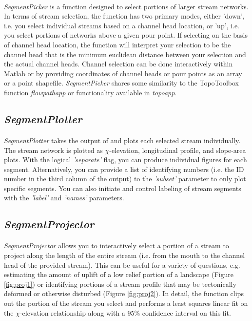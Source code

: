 \paragraph{}\textit{SegmentPicker} is a function designed to select portions of larger stream networks. In terms of stream selection, the function has two primary modes, either 'down', i.e. you select individual streams based on a channel head location, or 'up', i.e. you select portions of networks above a given pour point. If selecting on the basis of channel head location, the function will interpret your selection to be the channel head that is the minimum euclidean distance between your selection and the actual channel heads. Channel selection can be done interactively within Matlab or by providing coordinates of channel heads or pour points as an array or a point shapefile. \textit{SegmentPicker} shares some similarity to the TopoToolbox function \textit{flowpathapp} or functionality available in \textit{topoapp}.

\subsection{\textit{SegmentPlotter}}
\paragraph{}\textit{SegmentPlotter} takes the output of  and plots each selected stream individually. The stream network is plotted as $\chi$-elevation, longitudinal profile, and slope-area plots. With the logical \textit{'separate'} flag, you can produce individual figures for each segment. Alternatively, you can provide a list of identifying numbers (i.e. the ID number in the third column of the  output) to the \textit{'subset'} parameter to only plot specific segments. You can also initiate and control labeling of stream segments with the \textit{'label'} and \textit{'names'} parameters.

\subsection{\textit{SegmentProjector}}

\paragraph{}\textit{SegmentProjector} allows you to interactively select a portion of a stream to project along the length of the entire stream (i.e. from the mouth to the channel head of the provided stream). This can be useful for a variety of questions, e.g. estimating the amount of uplift of a low relief portion of a landscape (Figure \ref{fig:proj1}) or identifying portions of a stream profile that may be tectonically deformed or otherwise disturbed (Figure \ref{fig:proj2}). In detail, the function clips out the portion of the stream you select and performs a least squares linear fit on the $\chi$-elevation relationship along with a 95\% confidence interval on this fit. 

